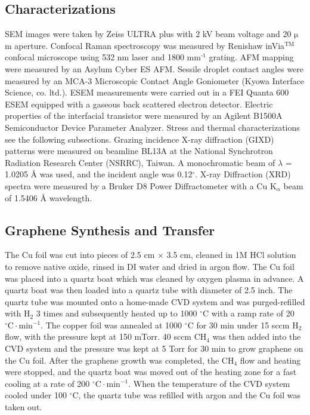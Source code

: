 \subsection*{Characterizations}
\label{sec:small-org048d24a}
SEM images were taken by Zeiss ULTRA plus with 2 kV beam voltage
and 20 \(\mathrm{\mu}\)m aperture. Confocal Raman spectroscopy was
measured by Renishaw inVia\(^{\textrm{TM}}\) confocal microscope using
532 nm laser and 1800 mm\(^{\text{-1}}\) grating. AFM mapping were measured by
an Asylum Cyber ES AFM. Sessile droplet contact angles were measured
by an MCA-3 Microscopic Contact Angle Goniometer (Kyowa Interface
Science, co. ltd.). ESEM measurements were carried out in a FEI
Quanta 600 ESEM equipped with a gaseous back scattered electron
detector. Electric properties of the interfacial transistor were
measured by an Agilent B1500A Semiconductor Device Parameter
Analyzer. Stress and thermal characterizations see the following
subsections. Grazing incidence X-ray diffraction (GIXD) patterns
were measured on beamline BL13A at the National Synchrotron
Radiation Research Center (NSRRC), Taiwan. A monochromatic beam of
\(\lambda\) = 1.0205 \AA{} was used, and the incident angle was
0.12\(^{\circ}\). X-ray Diffraction (XRD) spectra were measured by
a Bruker D8 Power Diffractometer with a Cu K\(_{\alpha}\) beam of
1.5406 \AA{} wavelength.

\subsection*{Graphene Synthesis and Transfer}
\label{sec:small-org7dad228}

The Cu foil was cut into pieces of 2.5 cm \(\times\) 3.5 cm, cleaned
in 1M HCl solution to remove native oxide, rinsed in DI water and
dried in argon flow. The Cu foil was placed into a quartz boat which
was cleaned by oxygen plasma in advance. A quartz boat was then loaded
into a quartz tube with diameter of 2.5 inch. The quartz tube was
mounted onto a home-made CVD system and was purged-refilled with
H\(_{\text{2}}\) 3 times and subsequently heated up to 1000
\(^\circ \mathrm{C}\) with a ramp rate of 20
\(^{\circ}\mathrm{C} \cdot \mathrm{min}^{-1}\). The copper foil was
annealed at 1000 \(^\circ \mathrm{C}\) for 30 min under 15 sccm
H\(_{\text{2}}\) flow, with the pressure kept at 150 mTorr. 40 sccm
CH\(_{\text{4}}\) was then added into the CVD system and the pressure
was kept at 5 Torr for 30 min to grow graphene on the Cu foil. After
the graphene growth was completed, the CH\(_{\text{4}}\) flow and
heating were stopped, and the quartz boat was moved out of the heating
zone for a fast cooling at a rate of 200
\(^{\circ}\mathrm{C} \cdot \mathrm{min}^{-1}\). When the temperature
of the CVD system cooled under 100 \(^{\circ}\mathrm{C}\), the quartz
tube was refilled with argon and the Cu foil was taken out.

